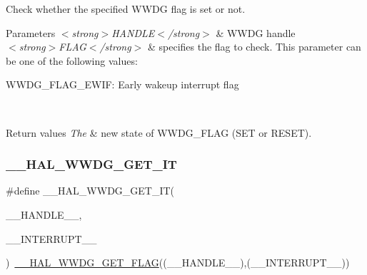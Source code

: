 Check whether the specified W\+W\+DG flag is set or not. 


\begin{DoxyParams}{Parameters}
{\em $<$strong$>$\+H\+A\+N\+D\+L\+E$<$/strong$>$} & W\+W\+DG handle \\
\hline
{\em $<$strong$>$\+F\+L\+A\+G$<$/strong$>$} & specifies the flag to check. This parameter can be one of the following values\+: \begin{DoxyItemize}
\item W\+W\+D\+G\+\_\+\+F\+L\+A\+G\+\_\+\+E\+W\+IF\+: Early wakeup interrupt flag \end{DoxyItemize}
\\
\hline
\end{DoxyParams}

\begin{DoxyRetVals}{Return values}
{\em The} & new state of W\+W\+D\+G\+\_\+\+F\+L\+AG (S\+ET or R\+E\+S\+ET). \\
\hline
\end{DoxyRetVals}
\mbox{\label{group___w_w_d_g___exported___macros_ga80eb5c31bde6248b9fe38a6f7bd1710d}} 
\subsubsection{\texorpdfstring{\+\_\+\+\_\+\+H\+A\+L\+\_\+\+W\+W\+D\+G\+\_\+\+G\+E\+T\+\_\+\+IT}{\_\_HAL\_WWDG\_GET\_IT}}
{\footnotesize\ttfamily \#define \+\_\+\+\_\+\+H\+A\+L\+\_\+\+W\+W\+D\+G\+\_\+\+G\+E\+T\+\_\+\+IT(\begin{DoxyParamCaption}\item[{}]{\+\_\+\+\_\+\+H\+A\+N\+D\+L\+E\+\_\+\+\_\+,  }\item[{}]{\+\_\+\+\_\+\+I\+N\+T\+E\+R\+R\+U\+P\+T\+\_\+\+\_\+ }\end{DoxyParamCaption})~\hyperlink{group___w_w_d_g___exported___macros_ga60a99447a00a7d95c18637c38147063a}{\+\_\+\+\_\+\+H\+A\+L\+\_\+\+W\+W\+D\+G\+\_\+\+G\+E\+T\+\_\+\+F\+L\+AG}((\+\_\+\+\_\+\+H\+A\+N\+D\+L\+E\+\_\+\+\_\+),(\+\_\+\+\_\+\+I\+N\+T\+E\+R\+R\+U\+P\+T\+\_\+\+\_\+))}



